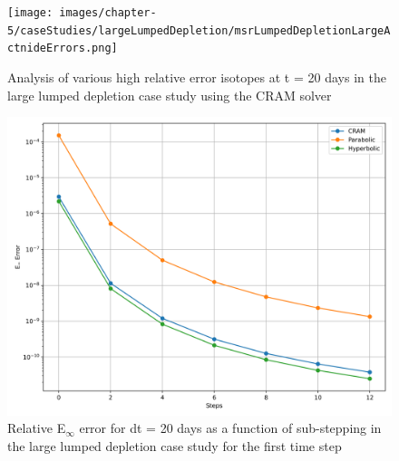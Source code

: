 \clearpage

\begin{figure}[p]
    \centering
    \texttt{[image: images/chapter-5/caseStudies/largeLumpedDepletion/msrLumpedDepletionLargeActnideErrors.png]}
    \caption{Analysis of various high relative error isotopes at t = 20 days in the large lumped depletion case study using the CRAM solver}
    \label{fig:large_lumped_depletion_actnide_errors}
\end{figure}

\clearpage

\begin{figure}[p]
    \centering
    \includegraphics[width=5in]{images/chapter-5/caseStudies/largeLumpedDepletion/msrLargeLumpedDepletionEinfErrorerrorWithSteps.png}
    \caption{Relative E$_{\infty}$ error for dt = 20 days as a function of sub-stepping in the large lumped depletion case study for the first time step}
    \label{fig:large_lumped_depletion_Einf_with_substeps}
\end{figure}

\clearpage

